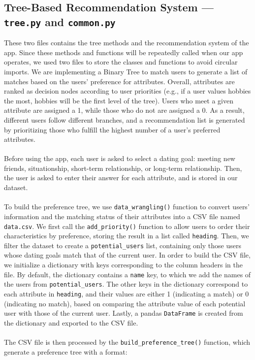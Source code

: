 \documentclass[fontsize=11pt]{article}
\begin{document}
\subsection*{Tree-Based Recommendation System --- \texttt{tree.py} and \texttt{common.py}}
These two files contains the tree methods and the recommendation system of the app.
Since these methods and functions will be repeatedly called when our app operates, we used two files to store the classes and functions to avoid circular imports.
We are implementing a Binary Tree to match users to generate a list of matches based on the users’ preference for attributes. 
Overall, attributes are ranked as decision nodes according to user priorities (e.g., if a user values hobbies the most, hobbies will be the first level of the tree). 
Users who meet a given attribute are assigned a 1, while those who do not are assigned a 0. As a result, different users follow different branches, and a recommendation list is generated by prioritizing those who fulfill the highest number of a user's preferred attributes.
\\
\\
Before using the app, each user is asked to select a dating goal: meeting new friends, situationship, short-term relationship, or long-term relationship.
Then, the user is asked to enter their answer for each attribute, and is stored in our dataset.
\\
\\
To build the preference tree, we use \texttt{data\_wrangling()} function to convert users' information and the matching status 
of their attributes into a CSV file named \texttt{data.csv}. We first call the \texttt{add\_priority()} function to allow users to order their characteristics 
by preference, storing the result in a list called \texttt{heading}. Then, we filter the dataset to create a \texttt{potential\_users} list, containing only 
those users whose dating goals match that of the current user. In order to build the CSV file, we initialize a dictionary with keys corresponding to the column 
headers in the file. By default, the dictionary contains a \texttt{name} key, to which we add the names of the users from \texttt{potential\_users}. The other keys in 
the dictionary correspond to each attribute in \texttt{heading}, and their values are either 1 (indicating a match) or 0 (indicating no match), based on comparing the 
attribute value of each potential user with those of the current user. Lastly, a pandas \texttt{DataFrame} is created from the dictionary and exported to the CSV file.
\\
\\
The CSV file is then processed by the \texttt{build\_preference\_tree()} function, which generate a preference tree with a format:  
\end{document}

